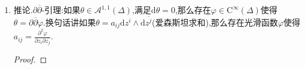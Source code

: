\begin{enumerate}
\begin{proof}
		第四步,完成证明.设$\alpha\in\mathscr{A}^{0,q}(\Delta)$使得$\overline{\partial}\alpha=0$,$q\ge1$.当$q=1$时,我们先取一列子polydisc,它们的中心都和$\Delta$的中心相同,满足$\Delta_0\subseteq\Delta_1\subseteq\cdots\subseteq\Delta$,使得$\overline{\Delta}_i\subseteq\Delta_{i+1}$,并且有$\cup_i\Delta_i=\Delta$.那么按照第三步,存在$g_i\in\mathrm{C}^{\infty}(\Delta)$使得$\overline{\partial}g_i=\alpha$在$\Delta_i$上成立.我们断言可以重新选取这样的$\{g_i\}$,使得在每个$\Delta_{i-1}$上总有$|g_{i+1}-g_i|\le2^{-i}$.一旦这成立,则函数列$\{g_i\}$的极限$g$满足在整个$\Delta$上有$\overline{\partial}g=\alpha$.首先按照$\overline{\partial}(g_2-g_1)$在$\Delta_1$上为零,说明$g_2-g_1$是$\Delta_1$上的全纯函数,那么有Taylor展开,取展开中足够多有限项$p_N(z)$使得$|g_2-g_1-p_N|<2^{-1}$在$\Delta_0$上一致成立(因为$\Delta_0$闭包紧),我们用$g_2-p_N$重新记作$g_2$,那么$\overline{\partial}g_2=0$在$\Delta_2$上依旧成立,并且有$|g_2-g_1|<2^{-1}$在$\Delta_0$上一致成立.接着考虑$g_3-g_2$,类似的用某个$g_3-p_N$代替$g_3$,归纳构造下去即可.
		
		\qquad
		
		设$q\ge2$,依旧取$\Delta$的子polydisc构成的上述滤过$\{\Delta_i\}$.首先第二步说明存在$\beta_i\in\mathscr{A}^{0,q-1}(\Delta_i)$使得$\overline{\partial}\beta_i=\alpha$在$\Delta_i$上成立.于是$\overline{\partial}(\beta_{i+1}-\beta_i)=0$在$\Delta_i$上成立,这里$\beta_{i+1}-\beta_i$是一个$(0,q-1)$形式,其中$q-1\ge1$,所以再用一次第三步,可取$\gamma_i\in\mathscr{A}^{0,q-2}(\Delta_i)$使得$\beta_{i+1}-\beta_i=\overline{\partial}\gamma_i$在$\Delta_{i-1}$上成立.我们用$\beta_{i+1}-\overline{\partial}\gamma_i$代替$\beta_{i+1}$,就导致$\beta_{i+1}=\beta_i$在$\Delta_{i-1}$上成立.所以取$\beta$是这些$\beta_i$的并,那么它定义在整个$\Delta$上并且有$\overline{\partial}\beta=\alpha$.
	\end{proof}
	\item 推论.$\partial\overline{\partial}$-引理:如果$\theta\in\mathscr{A}^{1,1}(\Delta)$,满足$\mathrm{d}\theta=0$,那么存在$\varphi\in\mathrm{C}^{\infty}(\Delta)$使得$\theta=\partial\overline{\partial}\varphi$.换句话讲如果$\theta=a_{ij}\mathrm{d}z^i\wedge\mathrm{d}\overline{z^j}$(爱森斯坦求和),那么存在光滑函数$\varphi$使得$a_{ij}=\frac{\partial^2\varphi}{\partial z_i\partial\overline{z_j}}$.
	\begin{proof}
		

\end{proof}
\end{enumerate}
